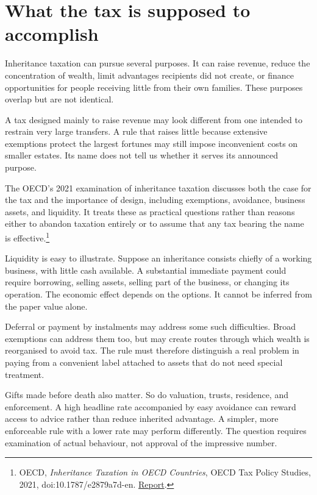 \documentclass[12pt,a4paper]{book}
\begin{document}
\section*{What the tax is supposed to accomplish}

Inheritance taxation can pursue several purposes. It can raise revenue, reduce the concentration of wealth, limit advantages recipients did not create, or finance opportunities for people receiving little from their own families. These purposes overlap but are not identical.

A tax designed mainly to raise revenue may look different from one intended to restrain very large transfers. A rule that raises little because extensive exemptions protect the largest fortunes may still impose inconvenient costs on smaller estates. Its name does not tell us whether it serves its announced purpose.

The OECD's 2021 examination of inheritance taxation discusses both the case for the tax and the importance of design, including exemptions, avoidance, business assets, and liquidity. It treats these as practical questions rather than reasons either to abandon taxation entirely or to assume that any tax bearing the name is effective.\footnote{OECD, \emph{Inheritance Taxation in OECD Countries}, OECD Tax Policy Studies, 2021, doi:10.1787/e2879a7d-en. \href{https://www.oecd.org/en/publications/inheritance-taxation-in-oecd-countries_e2879a7d-en.html}{Report}.}

Liquidity is easy to illustrate. Suppose an inheritance consists chiefly of a working business, with little cash available. A substantial immediate payment could require borrowing, selling assets, selling part of the business, or changing its operation. The economic effect depends on the options. It cannot be inferred from the paper value alone.

Deferral or payment by instalments may address some such difficulties. Broad exemptions can address them too, but may create routes through which wealth is reorganised to avoid tax. The rule must therefore distinguish a real problem in paying from a convenient label attached to assets that do not need special treatment.

Gifts made before death also matter. So do valuation, trusts, residence, and enforcement. A high headline rate accompanied by easy avoidance can reward access to advice rather than reduce inherited advantage. A simpler, more enforceable rule with a lower rate may perform differently. The question requires examination of actual behaviour, not approval of the impressive number.
\end{document}

